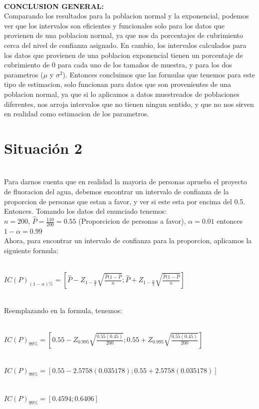 \documentclass[letterpaper,12pt,onecolumn,titlepage]{article}
\begin{document}
~\\\textbf{CONCLUSION GENERAL:}
~\\ Comparando los resultados para la poblacion normal y la exponencial, podemos ver que los intervalos son eficientes y funcionales solo para los datos que provienen de una poblacion normal, ya que nos da porcentajes de cubrimiento cerca del nivel de confianza asignado. En cambio, los intervalos calculados para los datos que provienen de una poblacion exponencial tienen un porcentaje de cubrimiento de 0 para cada uno de los tama\~{n}os de muestra, y para los dos parametros ($\mu$ y $\sigma^2$).
Entonces concluimos que las formulas que tenemos para este tipo de estimacion, solo funcionan para datos que son provenientes de una poblacion normal, ya que si lo aplicamos a datos muestreados de poblaciones diferentes, nos arroja intervalos que no tienen ningun sentido, y que no nos sirven en realidad como estimacion de los parametros.
\pagebreak\section{Situaci\'{o}n 2}
~\\ Para darnos cuenta que en realidad la mayoria de personas aprueba el proyecto de fluoracion del agua, debemos encontrar un intervalo de confianza de la proporcion de personas que estan a favor, y ver si este esta por encima del 0.5.
~\\ Entonces. Tomando los datos del enunciado tenemos:
~\\ $n=200$, $\hat{P}=\frac{110}{200}=0.55$ (Proporcicion de personas a favor), $\alpha=0.01$ entonces $1-\alpha=0.99$
~\\ Ahora, para encontrar un intervalo de confianza para la proporcion, aplicamos la siguiente formula:

~\\ $IC(P)_{(1-\alpha)\%}=\left[\hat{P}-Z_{1-\frac{\alpha}{2}}\sqrt{\frac{\hat{P}(1-\hat{P}}{n}};\hat{P}+Z_{1-\frac{\alpha}{2}}\sqrt{\frac{\hat{P}(1-\hat{P}}{n}}\right]$

~\\ Reemplazando en la formula, tenemos:

~\\ $IC(P)_{99\%}=\left[0.55-Z_{0.995}\sqrt{\frac{0.55(0.45)}{200}};0.55+Z_{0.995}\sqrt{\frac{0.55(0.45)}{200}}\right]$

~\\ $IC(P)_{99\%}=[0.55-2.5758(0.035178) ; 0.55+2.5758(0.035178)]$

~\\ $IC(P)_{99\%}=[0.4594 ; 0.6406]$
\end{document}
